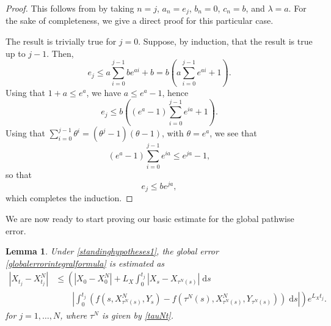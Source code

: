 \documentclass[reqno,12pt]{amsart}
\theoremstyle{plain}%
\newtheorem{lem}{Lemma}[section]
\theoremstyle{definition}
\begin{document}
\begin{proof}
    This follows from \cite[Lemma V.2.4]{GiraultRaviart1981} by taking $n = j$, $a_n = e_j$, $b_n = 0$, $c_n = b$, and $\lambda = a$. For the sake of completeness, we give a direct proof for this particular case.
    
    The result is trivially true for $j=0$. Suppose, by induction, that the result is true up to $j-1$. Then,
    \[
        e_j \leq a \sum_{i=0}^{j-1} be^{ai} + b = b \left(a \sum_{i=0}^{j-1} e^{ai} + 1\right).
    \]
    Using that $1 + a \leq e^a$, we have $a \leq e^a - 1$, hence
    \[
        e_j \leq b\left((e^a - 1)\sum_{i=0}^{j-1} e^{ia} + 1\right).
    \]
    Using that $\sum_{i=0}^{j-1} \theta^i = (\theta^j - 1)(\theta - 1)$, with $\theta = e^a$, we see that
    \[
        (e^a - 1)\sum_{i=0}^{j-1} e^{ia} \leq e^{ja} - 1,
    \]
    so that
    \[
        e_j \leq be^{ja},
    \]
    which completes the induction.
\end{proof}

We are now ready to start proving our basic estimate for the global pathwise error.

\begin{lem}
    \label{lembasicestimate}
    Under \cref{standinghypotheses1}, the global error \eqref{globalerrorintegralformula} is estimated as
    \begin{equation}
        \label{Etjbasicbound}
        \begin{aligned}
            |X_{t_j} - X_{t_j}^N| & \leq \left( |X_0 - X_0^N| + L_X \int_0^{t_j} |X_s - X_{\tau^N(s)}| \;\mathrm{d}s \right. \\
            & \qquad \left. \left|\int_0^{t_j} \left( f(s, X_{\tau^N(s)}^N, Y_s) - f(\tau^N(s), X_{\tau^N(s)}^N, Y_{\tau^N(s)}) \right)\;\mathrm{d}s\right|\right) e^{L_X t_j}.
        \end{aligned}
    \end{equation}
    for $j=1, \ldots, N$, where $\tau^N$ is given by \eqref{tauNt}.
\end{lem}
\end{document}
